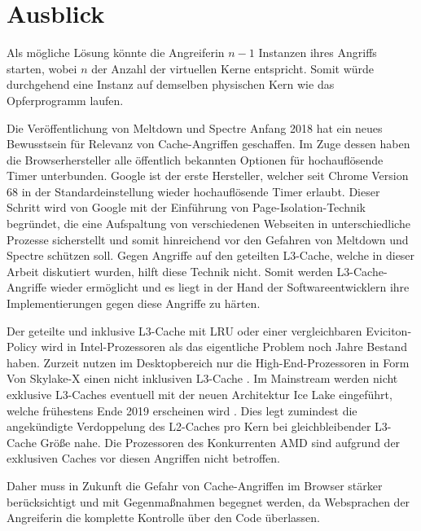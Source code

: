 
\section{Ausblick}

Als mögliche Lösung könnte die Angreiferin $n-1$ Instanzen ihres Angriffs starten, wobei $n$ der Anzahl der virtuellen Kerne entspricht.
Somit würde durchgehend eine Instanz auf demselben physischen Kern wie das Opferprogramm laufen.

Die Veröffentlichung von Meltdown und Spectre Anfang 2018 hat ein neues Bewusstsein für Relevanz von Cache-Angriffen geschaffen.
Im Zuge dessen haben die Browserhersteller alle öffentlich bekannten Optionen für hochauflösende Timer unterbunden.
Google ist der erste Hersteller, welcher seit Chrome Version 68 in der Standardeinstellung wieder hochauflösende Timer erlaubt.
Dieser Schritt wird von Google mit der Einführung von Page-Isolation-Technik \cite{ChromeSiteIsolation} begründet, die eine Aufspaltung von verschiedenen Webseiten in unterschiedliche Prozesse sicherstellt und somit hinreichend vor den Gefahren von Meltdown und Spectre schützen soll.
Gegen Angriffe auf den geteilten L3-Cache, welche in dieser Arbeit diskutiert wurden, hilft diese Technik nicht.
Somit werden L3-Cache-Angriffe wieder ermöglicht und es liegt in der Hand der Softwareentwicklern ihre Implementierungen gegen diese Angriffe zu härten.

Der geteilte und inklusive L3-Cache mit LRU oder einer vergleichbaren Eviciton-Policy wird in Intel-Prozessoren als das eigentliche Problem noch Jahre Bestand haben.
Zurzeit nutzen im Desktopbereich nur die High-End-Prozessoren in Form Von Skylake-X einen nicht inklusiven L3-Cache \cite{SkylakeXL3Cache}.
Im Mainstream werden nicht exklusive L3-Caches eventuell mit der neuen Architektur Ice Lake eingeführt, welche frühestens Ende 2019 erscheinen wird \cite{IceLakeReleaseDate}.
Dies legt zumindest die angekündigte Verdoppelung des L2-Caches pro Kern bei gleichbleibender L3-Cache Größe nahe.
Die Prozessoren des Konkurrenten AMD sind aufgrund der exklusiven Caches \cite{CacheRyzen} vor diesen Angriffen nicht betroffen.

Daher muss in Zukunft die Gefahr von Cache-Angriffen im Browser stärker berücksichtigt und mit Gegenmaßnahmen begegnet werden, da Websprachen der Angreiferin die komplette Kontrolle über den Code überlassen.








